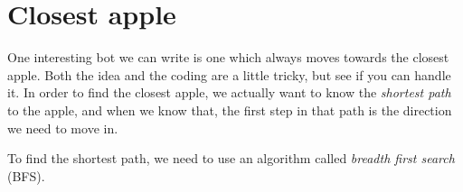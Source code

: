 \section{Closest apple}

One interesting bot we can write is one which always moves towards the closest
apple. Both the idea and the coding are a little tricky, but see if you can
handle it. In order to find the closest apple, we actually want to know
the \emph{shortest path} to the apple, and when we know that, the first step in
that path is the direction we need to move in.

To find the shortest path, we need to use an algorithm called
\emph{breadth first search} (BFS).

